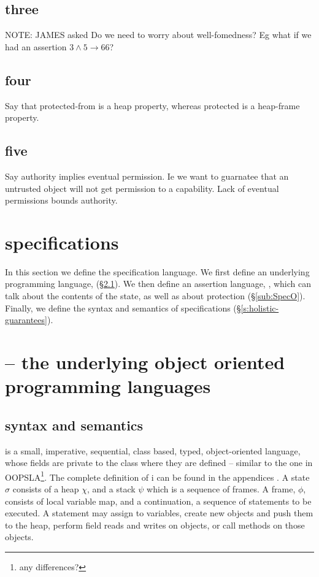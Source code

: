 \subsection{three}
NOTE: JAMES asked Do we need to worry about well-fomedness? Eg what if
we had an assertion $3 \wedge 5 \rightarrow 66$?

  

\subsection{four}
Say that protected-from is a heap property, whereas protected is a
heap-frame property.


\subsection{five}
Say authority implies eventual permission. Ie we want to guarnatee that an untrusted object will not get permission to a capability. Lack of eventual permissions bounds authority.


\section{\SpecLang specifications}
\label{s:semantics}

 
In this section we define {the}  \SpecLang specification language.  
We first define an underlying programming language, \LangOO (\S \ref{sub:Loo}).
We then define an assertion language, \AssertLang, which can talk about the
contents of the state, as well as about protection (\S \ref{sub:SpecO}).  Finally, we define the syntax and
semantics of  \SpecLang
specifications (\S \ref{s:holistic-guarantees}).

 


\section{\LangOO -- the underlying object oriented programming languages}

\subsection{\LangOO syntax and semantics}
\label{sub:Loo} 
 \LangOO  is a {small}, imperative, sequential, 
class based, typed, object-oriented language, whose
fields are private to the class where they are defined -- similar to the one in OOPSLA\footnote{any differences?}.
The complete definition of \LangOO i 
{can be found in the appendices  \cite{necessityFull}.}
 A \LangOO state $\sigma$ consists of a 
heap $\chi$, and a  {stack $\psi$ which is a sequence of frames}.
A frame, $\phi$, consists of
local variable map, and a continuation, \ie a sequence of statements to be executed.
 A statement may assign to variables, create new objects and push them to the heap, 
perform field reads and writes on objects,  or
 call methods on those objects. 

